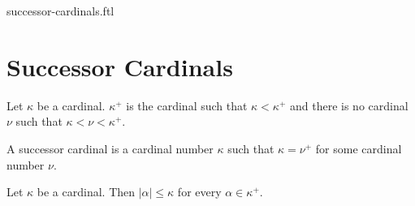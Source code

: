 \documentclass{naproche-library}
\begin{document}
\begin{smodule}{successor-cardinals.ftl}

  \section*{Successor Cardinals}

  \begin{definition}[forthel,id=SET_THEORY_06_9568425123021254,printid]
    Let $\kappa$ be a cardinal.
    $\kappa^+$ is the cardinal such that $\kappa < \kappa^+$ and there is no cardinal $\nu$ such that $\kappa < \nu < \kappa^+$.
  \end{definition}

  \begin{definition}[forthel,id=SET_THEORY_06_6818986081648640,printid]
    A successor cardinal is a cardinal number $\kappa$ such that $\kappa = \nu^+$ for some cardinal number $\nu$.
  \end{definition}

  \begin{proposition}[forthel,id=SET_THEORY_06_5231202126545218,printid]
    Let $\kappa$ be a cardinal.
    Then $|\alpha| \leq \kappa$ for every $\alpha \in \kappa^+$.
  \end{proposition}
\end{smodule}
\end{document}
